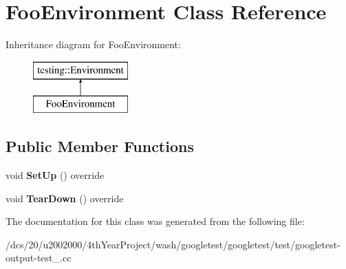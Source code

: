 \hypertarget{classFooEnvironment}{}\section{Foo\+Environment Class Reference}
\label{classFooEnvironment}
Inheritance diagram for Foo\+Environment\+:\begin{figure}[H]
\begin{center}
\leavevmode
\includegraphics[height=2.000000cm]{classFooEnvironment}
\end{center}
\end{figure}
\subsection*{Public Member Functions}
\begin{DoxyCompactItemize}
\item 
\mbox{\label{classFooEnvironment_abf6a0edbb3be025e9f143a7a1b89f9dd}} 
void {\bfseries Set\+Up} () override
\item 
\mbox{\label{classFooEnvironment_a68511512cce59c5b848dc23b1300dc5a}} 
void {\bfseries Tear\+Down} () override
\end{DoxyCompactItemize}


The documentation for this class was generated from the following file\+:\begin{DoxyCompactItemize}
\item 
/dcs/20/u2002000/4th\+Year\+Project/wash/googletest/googletest/test/googletest-\/output-\/test\+\_\+.\+cc\end{DoxyCompactItemize}

